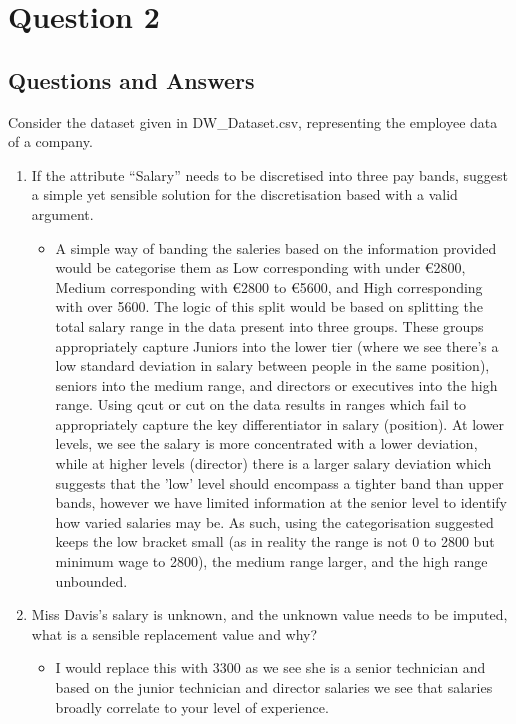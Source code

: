 \documentclass{scrreprt}
\begin{document}
	
\newpage
\chapter{Question 2}
\section{Questions and Answers}
Consider the dataset given in DW\_Dataset.csv, representing the employee data of a company.


\begin{enumerate}
	\item If the attribute “Salary” needs to be discretised into three pay bands, suggest a simple yet sensible solution for the discretisation based with a valid argument.
		\begin{itemize}
			\item A simple way of banding the saleries based on the information provided would be categorise them as Low corresponding with under €2800, Medium corresponding with €2800 to €5600, and High corresponding with over 5600. The logic of this split would be based on splitting the total salary range in the data present into three groups. These groups appropriately capture Juniors into the lower tier (where we see there's a low standard deviation in salary between people in the same position), seniors into the medium range, and directors or executives into the high range. Using qcut or cut on the data results in ranges which fail to appropriately capture the key differentiator in salary (position). At lower levels, we see the salary is more concentrated with a lower deviation, while at higher levels (director) there is a larger salary deviation which suggests that the 'low' level should encompass a tighter band than upper bands, however we have limited information at the senior level to identify how varied salaries may be. As such, using the categorisation suggested keeps the low bracket small (as in reality the range is not 0 to 2800 but minimum wage to 2800), the medium range larger, and the high range unbounded.
		\end{itemize}
	\item Miss Davis's salary is unknown, and the unknown value needs to be imputed, what is a sensible replacement value and why?
		\begin{itemize}
		\item I would replace this with 3300 as we see she is a senior technician and based on the junior technician and director salaries we see that salaries broadly correlate to your level of experience.
		\end{itemize}
	

\end{enumerate}
\end{document}
